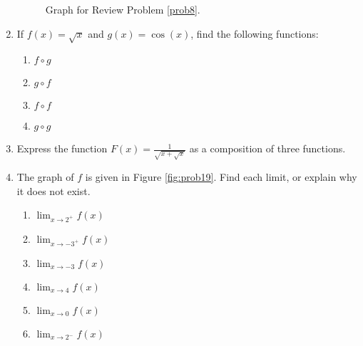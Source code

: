 \begin{enumerate}
\begin{figure}[!h]

\caption{Graph for Review Problem \ref{prob8}.}
\label{fig:prob8}

\end{figure}



\item If \(f(x) = \sqrt{x}\) and \(g(x) = \cos(x)\), find the following functions:
\begin{enumerate}

\item \(f \circ g\)
\item \(g \circ f\)
\item \(f \circ f\)
\item \(g \circ g\)

\end{enumerate}

\item Express the function \(F(x) = \frac{1}{\sqrt{x+\sqrt{x}}}\) as a composition of three functions.

\item The graph of \(f\) is given in Figure \ref{fig:prob19}. Find each limit, or explain why it does not exist. \label{prob19}

\begin{enumerate}
\item \(\displaystyle \lim_{x\rightarrow 2^+} f(x)\)
\item \(\displaystyle \lim_{x\rightarrow -3^+} f(x)\)
\item \(\displaystyle \lim_{x\rightarrow -3} f(x)\)
\item \(\displaystyle \lim_{x\rightarrow 4} f(x)\)
\item \(\displaystyle \lim_{x\rightarrow 0} f(x)\)
\item \(\displaystyle \lim_{x\rightarrow 2^-} f(x)\)

\end{enumerate}





\end{enumerate}
